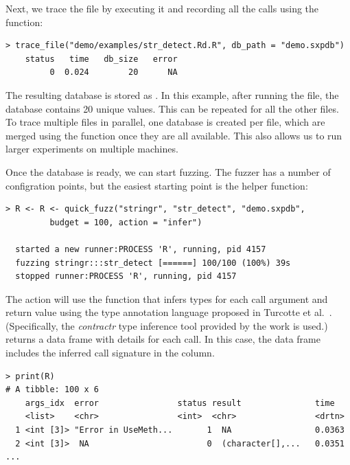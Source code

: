 \documentclass[sigplan,nonacm,anonymous,review]{acmart}
\begin{document}
Next, we trace the file by executing it and recording all the calls using the  function:

\begin{lstlisting}
> trace_file("demo/examples/str_detect.Rd.R", db_path = "demo.sxpdb")
    status   time   db_size   error
         0  0.024        20      NA
\end{lstlisting}

The resulting database is stored as . 
In this example, after running the  file, the database contains 20 unique values. 
This can be repeated for all the other files. 
To trace multiple files in parallel, one database is created per file, which are merged using the  function once they are all available.
This also allows us to run larger experiments on multiple machines.

Once the database is ready, we can start fuzzing.
The fuzzer has a number of configration points, but the easiest starting point is the  helper function:

\begin{lstlisting}
> R <- R <- quick_fuzz("stringr", "str_detect", "demo.sxpdb",
		 budget = 100, action = "infer")

  started a new runner:PROCESS 'R', running, pid 4157
  fuzzing stringr:::str_detect [======] 100/100 (100%) 39s
  stopped runner:PROCESS 'R', running, pid 4157
\end{lstlisting}

The  action will use the  function that infers types for each call argument and return value using the type annotation language proposed in Turcotte et al.~\cite{turcotte2020designing}.
(Specifically, the \emph{contractr} type inference tool provided by the work is used.)
 returns a data frame with details for each call.
In this case, the data frame includes the inferred call signature in the  column. %

\begin{lstlisting}
> print(R)
# A tibble: 100 x 6
    args_idx  error                status result               time
    <list>    <chr>                <int>  <chr>                <drtn>
  1 <int [3]> "Error in UseMeth...       1  NA                 0.0363
  2 <int [3]>  NA                        0  (character[],...   0.0351
...
\end{lstlisting}
\end{document}

